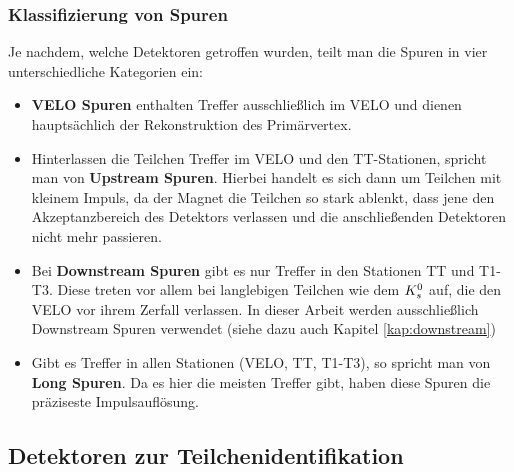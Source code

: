 \subsubsection{Klassifizierung von Spuren}
Je nachdem, welche Detektoren getroffen wurden, teilt man die Spuren in vier unterschiedliche Kategorien ein:
\begin{itemize}
\item \textbf{VELO Spuren} enthalten Treffer ausschließlich im VELO und dienen hauptsächlich der Rekonstruktion des Primärvertex.
\item Hinterlassen die Teilchen Treffer im VELO und den TT-Stationen, spricht man von \textbf{Upstream Spuren}. Hierbei handelt es sich dann um Teilchen mit kleinem Impuls, da der Magnet die Teilchen so stark ablenkt, dass jene den Akzeptanzbereich des Detektors verlassen und die anschließenden Detektoren nicht mehr passieren.
\item Bei \textbf{Downstream Spuren} gibt es nur Treffer in den Stationen TT und T1-T3. Diese treten vor allem bei langlebigen Teilchen wie dem $K_s^0$ auf, die den VELO vor ihrem Zerfall verlassen. In dieser Arbeit werden ausschließlich Downstream Spuren verwendet (siehe dazu auch Kapitel \ref{kap:downstream})
\item Gibt es Treffer in allen Stationen (VELO, TT, T1-T3), so spricht man von \textbf{Long Spuren}. Da es hier die meisten Treffer gibt, haben diese Spuren die präziseste Impulsauflösung. \cite{thesis_linn}
\end{itemize}

\subsection{Detektoren zur Teilchenidentifikation}
